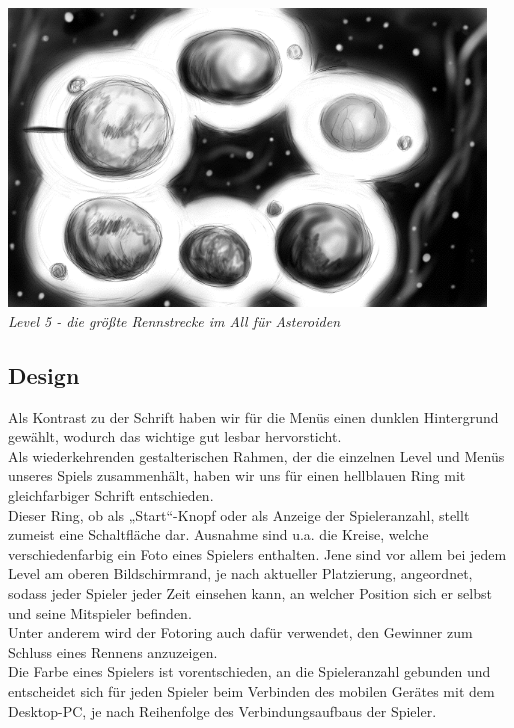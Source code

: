 \begin{flushright}
\includegraphics[width=0.95\textwidth]{img/asteroiden.png}\\
\textit{Level 5 - die größte Rennstrecke im All für Asteroiden}

\newpage

\end{flushright}

\subsection{Design}

Als Kontrast zu der Schrift haben wir für die Menüs einen dunklen Hintergrund gewählt, wodurch das wichtige gut lesbar hervorsticht.\\
Als wiederkehrenden gestalterischen Rahmen, der die einzelnen Level und Menüs unseres Spiels zusammenhält, haben wir uns für einen hellblauen Ring mit gleichfarbiger Schrift entschieden.\\
Dieser Ring, ob als „Start“-Knopf oder als Anzeige der Spieleranzahl, stellt zumeist eine Schaltfläche dar. Ausnahme sind u.a. die Kreise, welche verschiedenfarbig ein Foto eines Spielers enthalten. Jene sind vor allem bei jedem Level am oberen Bildschirmrand, je nach aktueller Platzierung, angeordnet, sodass jeder Spieler jeder Zeit einsehen kann, an welcher Position sich er selbst und seine Mitspieler befinden.\\
Unter anderem wird der Fotoring auch dafür verwendet, den Gewinner zum Schluss eines Rennens anzuzeigen.\\
Die Farbe eines Spielers ist vorentschieden, an die Spieleranzahl gebunden und entscheidet sich für jeden Spieler beim Verbinden des mobilen Gerätes mit dem Desktop-PC, je nach Reihenfolge des Verbindungsaufbaus der Spieler.

